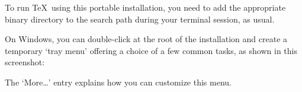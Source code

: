 \documentclass{article}
\begin{document}
To run \TeX\ using this portable installation, you need to add the
appropriate binary directory to the search path during your terminal
session, as usual.

On Windows, you can double-click  at the root
of the installation and create a temporary `tray menu' offering a
choice of a few common tasks, as shown in this screenshot:

\medskip
{}
\smallskip

\noindent The `More\ldots' entry explains how you can customize this menu.


%
%
%
%
%
%
\end{document}
